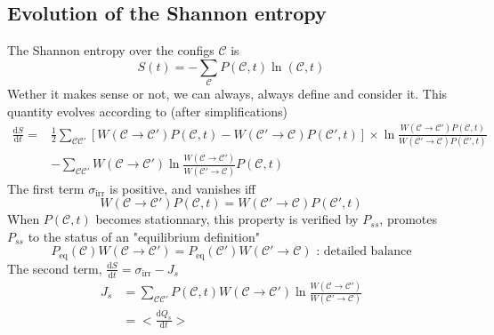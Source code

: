 \documentclass[a4paper]{book}
\theoremstyle{definition}
\theoremstyle{remark}
\begin{document}
\subsection{Evolution of the Shannon entropy}
The Shannon entropy over the configs $\mathscr{C}$ is 
\begin{equation}
    S(t) = -\sum_\mathscr{C} P(\mathscr{C}, t) \ln(\mathscr{C}, t)
\end{equation}
Wether it makes sense or not, we can always, always define and consider it. This quantity evolves according to (after simplifications)
\begin{equation}
    \begin{aligned}
        \frac{\text{d}S}{\text{d}t} = &\frac{1}{2}\sum_{\mathscr{C}\mathscr{C}'} \left[W(\mathscr{C} \rightarrow \mathscr{C}')P(\mathscr{C}, t) - W(\mathscr{C}' \rightarrow \mathscr{C})P(\mathscr{C}', t)\right] \times \ln \frac{W(\mathscr{C} \rightarrow \mathscr{C}')P(\mathscr{C}, t)}{W(\mathscr{C}' \rightarrow \mathscr{C})P(\mathscr{C}', t)} \\ 
        &- \sum_{\mathscr{C}\mathscr{C}'} W(\mathscr{C} \rightarrow \mathscr{C}') \ln \frac{W(\mathscr{C} \rightarrow \mathscr{C}')}{W(\mathscr{C}' \rightarrow \mathscr{C})} P(\mathscr{C}, t)
    \end{aligned}
\end{equation}
The first term $\sigma_{\text{irr}}$ is positive, and vanishes iff 
\begin{equation}
    W(\mathscr{C} \rightarrow \mathscr{C}')P(\mathscr{C}, t) = W(\mathscr{C}' \rightarrow \mathscr{C})P(\mathscr{C}', t)
\end{equation}
When $P(\mathscr{C}, t)$ becomes stationnary, this property is verified by $P_{ss}$, promotes $P_{ss}$ to the status of an "equilibrium definition"
\begin{equation}
    P_{\text{eq}}(\mathscr{C})W(\mathscr{C} \rightarrow \mathscr{C}') = P_{\text{eq}}(\mathscr{C}') W(\mathscr{C}' \rightarrow \mathscr{C})\text{ :  detailed balance}
\end{equation}
The second term, $\frac{\text{d}S}{\text{d}t} = \sigma_{\text{irr}} - J_s$
\begin{equation}
    \begin{aligned}
        J_s &= \sum_{\mathscr{C}\mathscr{C}'} P(\mathscr{C}, t) W(\mathscr{C} \rightarrow \mathscr{C}') \ln \frac{W(\mathscr{C} \rightarrow \mathscr{C}')}{W(\mathscr{C}' \rightarrow \mathscr{C})} \\ 
        &= <\frac{\text{d}Q_s}{\text{d}t}>
    \end{aligned}
\end{equation}
\end{document}
